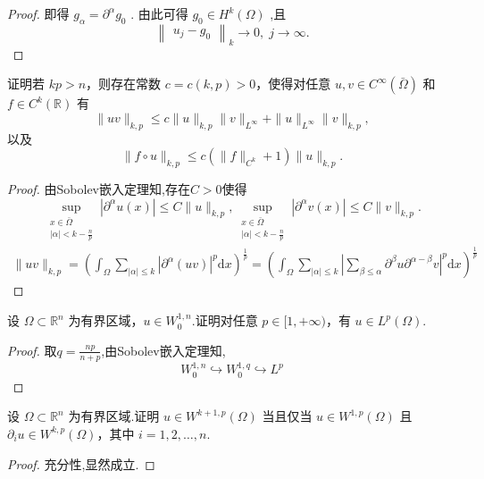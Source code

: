\documentclass[lang=cn,newtx,10pt,scheme=chinese,thmcnt=chapter]{elegantbook}
\newcommand{\dif}{\mathrm{d}}
\begin{document}
\begin{problemset}
\begin{proof}
即得 \({g}_{\alpha } = {\partial }^{\alpha }{g}_{0}\) . 由此可得 \({g}_{0} \in  {H}^{k}\left( \Omega \right)\) ,且
\begin{equation*}
{\begin{Vmatrix}{u}_{j} - {g}_{0}\end{Vmatrix}}_{k} \rightarrow  0,\;j \rightarrow  \infty .
\end{equation*}
\end{proof}
\item 证明若 \({kp} > n\)，则存在常数 \(c = c(k,p) > 0\)，使得对任意 \(u,v \in {C}^{\infty}(\bar{\Omega})\) 和 \(f \in {C}^{k}(\mathbb{R})\) 有
\[
\|uv\|_{k,p} \leqslant c\|u\|_{k,p}\|v\|_{L^{\infty}} + \|u\|_{L^{\infty}}\|v\|_{k,p},
\]
以及
\[
\|f \circ u\|_{k,p} \leqslant c\left(\|f\|_{C^{k}} + 1\right)\|u\|_{k,p}.
\]
\begin{proof}
  由Sobolev嵌入定理知,存在$C>0$使得
  \[
  \mathop{\sup }\limits_{\substack{{x \in  \bar{\Omega}} \\  {\left| \alpha \right|  < k-\frac{n}{p} } }}\left| {{\partial }^{\alpha }u\left( x\right) }\right|  \leqslant  C\parallel u{\parallel }_{k,p},  \mathop{\sup }\limits_{\substack{{x \in  \bar{\Omega}} \\  {\left| \alpha \right|  < k-\frac{n}{p} } }}\left| {{\partial }^{\alpha }v\left( x\right) }\right|  \leqslant  C\parallel v{\parallel }_{k,p}.
  \]
  \begin{equation*}
    \begin{aligned}
      \|uv\|_{k,p}=\left(\int_\Omega \sum_{|\alpha|\leqslant k}\left|\partial^\alpha (uv)\right|^p\dif x \right)^{\frac{1}{p}}=\left(\int_\Omega \sum_{|\alpha|\leqslant k}\left|\sum\limits_{\beta\leqslant \alpha}\partial^\beta u\partial^{\alpha-\beta }v\right|^p\dif x \right)^{\frac{1}{p}}
    \end{aligned}
  \end{equation*}
\end{proof}
\item 设 \(\Omega \subset {\mathbb{R}}^{n}\) 为有界区域，\(u \in {W}_{0}^{1,n}\).证明对任意 \(p \in [1,+\infty)\)，有 \(u \in {L}^{p}(\Omega)\).
\begin{proof}
    取$q=\frac{np}{n+p}$,由Sobolev嵌入定理知,
    \[W_0^{1,n}\hookrightarrow W_0^{1,q}\hookrightarrow L^p \]
    
\end{proof}
\item 设 \(\Omega \subset {\mathbb{R}}^{n}\) 为有界区域.证明 \(u \in {W}^{k+1,p}(\Omega)\) 当且仅当 \(u \in {W}^{1,p}(\Omega)\) 且 \({\partial}_{i}u \in {W}^{k,p}(\Omega)\)，其中 \(i = 1,2,\dots,n\).
\begin{proof}
    充分性,显然成立.


\end{proof}
\end{problemset}
\end{document}
